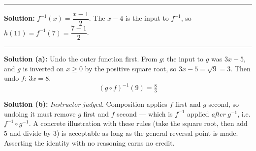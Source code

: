 \documentclass[12pt]{article}
\begin{document}
\vspace{0.1cm}\noindent\rule{\linewidth}{0.2pt}


\textbf{Solution:} $f^{-1}(x) = \dfrac{x-1}{2}$. The $x - 4$ is the input to $f^{-1}$, so $h(11) = f^{-1}(7) = \dfrac{7-1}{2}$. 

\vspace{0.1cm}\noindent\rule{\linewidth}{0.2pt}


\textbf{Solution (a):} Undo the outer function first. From $g$: the input to $g$ was $3x - 5$, and $g$ is inverted on $x \geq 0$ by the positive square root, so $3x - 5 = \sqrt{9} = 3$. Then undo $f$: $3x = 8$.
\[ \boxed{(g \circ f)^{-1}(9) = \tfrac{8}{3}} \]

\textbf{Solution (b):} \emph{Instructor-judged.} Composition applies $f$ first and $g$ second, so undoing it must remove $g$ first and $f$ second --- which is $f^{-1}$ applied \emph{after} $g^{-1}$, i.e. $f^{-1} \circ g^{-1}$. A concrete illustration with these rules (take the square root, then add $5$ and divide by $3$) is acceptable as long as the general reversal point is made. Asserting the identity with no reasoning earns no credit.
\end{document}
